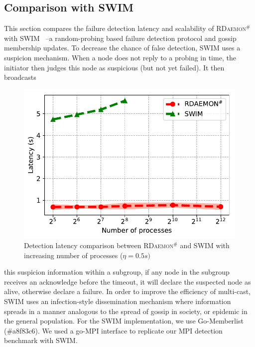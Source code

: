 \documentclass[sigconf]{acmart}
\newcommand{\mpi}[0]{\textsc{MPI}\xspace}
\newcommand{\ourwork}[0]{\textsc{RDaemon}\ensuremath{^\#}\xspace}
\begin{document}
\subsection{Comparison with SWIM}
This section compares the failure detection latency and scalability of \ourwork with SWIM~\cite{Abhinandan02} --a random-probing based failure detection protocol and gossip membership updates. To decrease
the chance of false detection, SWIM uses a suspicion mechanism. When a node does not reply to a probing in time, the initiator then judges this node as suspicious (but not yet failed). It then broadcasts
\begin{figure}[h]
  \centering
  \includegraphics[width=\linewidth]{Scale_prrte_swim.pdf}
  \caption{Detection latency comparison between \ourwork and SWIM with increasing number of processes ($\eta=0.5s)$}
  \label{fig:scale_swim}
\end{figure}
this suspicion information within a subgroup, if any node in the subgroup receives an acknowledge before the timeout, it will declare the suspected node as alive, otherwise declare a failure. In order to improve the efficiency of multi-cast, SWIM uses an infection-style dissemination mechanism where information spreads in a manner analogous to the spread of gossip in society, or epidemic in the general population.
For the SWIM implementation, we use Go-Memberlist (\#a8f83c6). We used a go-\mpi interface
to replicate our \mpi detection benchmark with SWIM.
\end{document}

